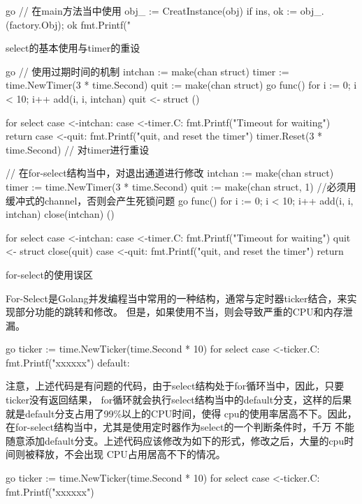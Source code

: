\begin{outline}[enumerate]
\begin{code-in-enumerate}{go}
// 在main方法当中使用
obj_ := CreatInstance(obj)
if ins, ok := obj_.(factory.Obj); ok {
    fmt.Printf("%
}
\end{code-in-enumerate}

  \1 select的基本使用与timer的重设

\begin{code-in-enumerate}{go}
// 使用过期时间的机制
intchan := make(chan struct{})
timer := time.NewTimer(3 * time.Second)
quit := make(chan struct{})
go func() {
    for i := 0; i < 10; i++ {
    add(i, i, intchan)
    }
    quit <- struct{}{}
}()

for {
    select {
    case <-intchan:
    case <-timer.C:
        fmt.Printf("Timeout for waiting\n")
        return
    case <-quit:
        fmt.Printf("quit, and reset the timer\n")
        timer.Reset(3 * time.Second) // 对timer进行重设
    }
}

// 在for-select结构当中，对退出通道进行修改
intchan := make(chan struct{})
timer := time.NewTimer(3 * time.Second)
quit := make(chan struct{}, 1) //必须用缓冲式的channel，否则会产生死锁问题
go func() {
    for i := 0; i < 10; i++ {
        add(i, i, intchan)
    }
    close(intchan)
}()

for {
    select {
    case <-intchan:
    case <-timer.C:
        fmt.Printf("Timeout for waiting\n")
        quit <- struct{}{}
        close(quit)
    case <-quit:
        fmt.Printf("quit, and reset the timer\n")
        return
    }
}
\end{code-in-enumerate}


  \1 for-select的使用误区

  For-Select是Golang并发编程当中常用的一种结构，通常与定时器ticker结合，来实现部分功能的跳转和修改。
  但是，如果使用不当，则会导致严重的CPU和内存泄漏。
\begin{code-in-enumerate}{go}
ticker := time.NewTicker(time.Second * 10)
for {
    select {
    case <-ticker.C:
        fmt.Printf("xxxxxx\n")
    default:
    }
}
\end{code-in-enumerate}

注意，上述代码是有问题的代码，由于select结构处于for循环当中，因此，只要ticker没有返回结果，
for循环就会执行select结构当中的default分支，这样的后果就是default分支占用了99\%以上的CPU时间，使得
cpu的使用率居高不下。因此，在for-select结构当中，尤其是使用定时器作为select的一个判断条件时，千万
不能随意添加default分支。上述代码应该修改为如下的形式，修改之后，大量的cpu时间则被释放，不会出现
CPU占用居高不下的情况。

\begin{code-in-enumerate}{go}
ticker := time.NewTicker(time.Second * 10)
for {
    select {
    case <-ticker.C:
        fmt.Printf("xxxxxx\n")
    }
}
\end{code-in-enumerate}


\end{outline}

